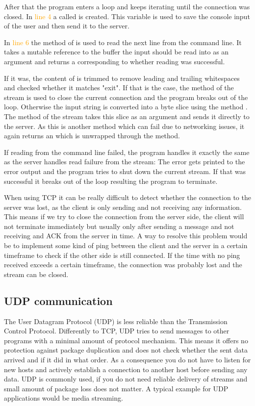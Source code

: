 After that the program enters a loop and keeps iterating until the connection was closed. In \textcolor{orange}{line 4}
a  called  is created. This variable is used to save the console input of the user and then send
it to the server.

In \textcolor{orange}{line 6} the method  of  is used to read the next
line from the command line. It takes a mutable reference to the buffer the input should be read into as an argument and
returns a  corresponding to whether reading was successful.

If it was, the content of  is trimmed to remove leading and trailing whitespaces and checked whether it
matches "exit". If that is the case, the  method of the stream is used to close the current connection
and the program breaks out of the loop. Otherwise the input string is converted into a byte slice using
the  method . The method  of the stream takes this slice as an argument and
sends it directly to the server. As this is another method which can fail due to networking issues, it again returns an
 which is unwrapped through the  method.

If reading from the command line failed, the program handles it exactly the same as the server handles read failure
from the stream: The error gets printed to the error output and the program tries to shut down the current stream. If
that was successful it breaks out of the loop resulting the program to terminate.

When using TCP it can be really difficult to detect whether the connection to the server was lost, as the client is
only sending and not receiving any information. This means if we try to close the connection from the server side, the
client will not terminate immediately but usually only after sending a message and not receiving and ACK from the
server in time. A way to resolve this problem would be to implement some kind of ping between the client and the server
in a certain timeframe to check if the other side is still connected. If the time with no ping received exceeds a
certain timeframe, the connection was probably lost and the stream can be closed.

\subsection{UDP communication}
The User Datagram Protocol (UDP) is less reliable than the Transmission Control Protocol. Differently to TCP, UDP tries
to send messages to other programs with a minimal amount of protocol mechanism. This means it offers no protection
against package duplication and does not check whether the sent data arrived and if it did in what order. As a
consequence you do not have to listen for new hosts and actively establish a connection to another host before sending
any data. UDP is commonly used, if you do not need reliable delivery of streams and small amount of package loss does
not matter. A typical example for UDP applications would be media streaming. \cite{RFC0768}

